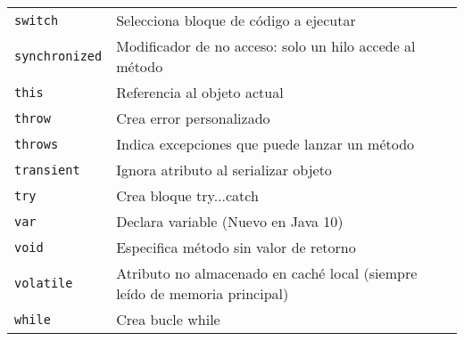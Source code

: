 \documentclass[12pt]{article}
\theoremstyle{largebreak}
\begin{document}
\begin{longtable}{l p{}}
    \lstinline|switch| & Selecciona bloque de código a ejecutar \\
    \lstinline|synchronized| & Modificador de no acceso: solo un hilo accede al método \\
    \lstinline|this| & Referencia al objeto actual \\
    \lstinline|throw| & Crea error personalizado \\
    \lstinline|throws| & Indica excepciones que puede lanzar un método \\
    \lstinline|transient| & Ignora atributo al serializar objeto \\
    \lstinline|try| & Crea bloque try...catch \\
    \lstinline|var| & Declara variable (Nuevo en Java 10) \\
    \lstinline|void| & Especifica método sin valor de retorno \\
    \lstinline|volatile| & Atributo no almacenado en caché local (siempre leído de memoria principal) \\
    \lstinline|while| & Crea bucle while \\
    \bottomrule
    \end{longtable}
\end{document}

